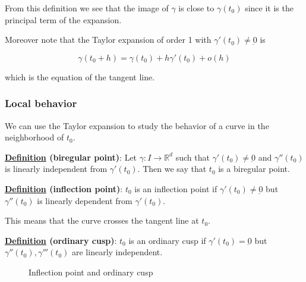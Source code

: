 \documentclass[10pt]{extarticle}
\newcommand{\R}{\mathbb{R}}
\newcommand{\munderbar}[1]{\underbar{\ensuremath{#1}}}
\begin{document}
From this definition we see that the image of $\gamma$ is close to $\gamma (t_0)$ since it is the principal term of the expansion.

Moreover note that the Taylor expansion of order 1 with $\gamma'(t_0) \ne \munderbar{0}$ is

$$
    \gamma(t_0 + h) = \gamma(t_0) + h \gamma'(t_0) + o(h)
$$

which is the equation of the tangent line.

\subsubsection{Local behavior}

We can use the Taylor expansion to study the behavior of a curve in the neighborhood of $t_0$.


\textbf{\underline{Definition} (biregular point)}:
Let $\gamma: I \to \R^d$ such that $\gamma'(t_0) \ne \munderbar{0}$ and $\gamma''(t_0)$ is linearly independent from $\gamma'(t_0)$.
Then we say that $t_0$ is a biregular point.

\textbf{\underline{Definition} (inflection point)}:
$t_0$ is an inflection point if $\gamma'(t_0) \ne \munderbar{0}$ but $\gamma''(t_0)$ is linearly dependent from $\gamma'(t_0)$.

This means that the curve crosses the tangent line at $t_0$.


\textbf{\underline{Definition} (ordinary cusp)}:
$t_0$ is an ordinary cusp if $\gamma'(t_0) = \munderbar{0}$ but $\gamma''(t_0), \gamma'''(t_0)$ are linearly independent.

\begin{figure}[H]
    \centering
    \caption{Inflection point and ordinary cusp}
    \label{fig:inflection_point_and_ordinary_cusp}
\end{figure}
\end{document}
